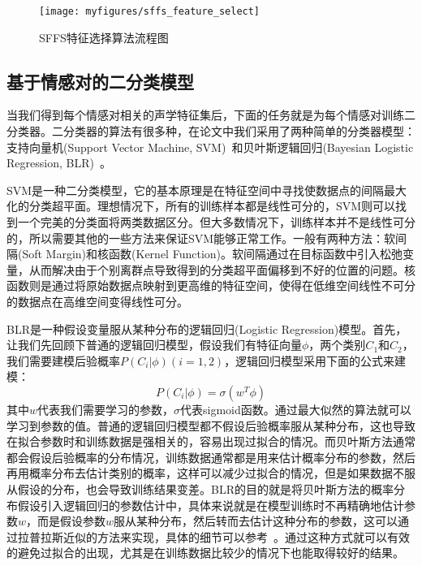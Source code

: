 \begin{figure}[htb] %
    \vspace{-0.8cm}  %
    \setlength{\belowcaptionskip}{0cm}   %
    \centering
    \texttt{[image: myfigures/sffs\_feature\_select]}
    \caption{SFFS特征选择算法流程图}
    \label{fig:sffs_feature_select}
\end{figure}

\subsection{基于情感对的二分类模型}
\label{ssec:emo_pair_bi_cls}

当我们得到每个情感对相关的声学特征集后，下面的任务就是为每个情感对训练二分类器。二分类器的算法有很多种，在论文中我们采用了两种简单的分类器模型：支持向量机(Support Vector Machine, SVM)~\cite{Burges2008A}和贝叶斯逻辑回归(Bayesian Logistic Regression, BLR)~\cite{Genkin2007Large}。

SVM是一种二分类模型，它的基本原理是在特征空间中寻找使数据点的间隔最大化的分类超平面。理想情况下，所有的训练样本都是线性可分的，SVM则可以找到一个完美的分类面将两类数据区分。但大多数情况下，训练样本并不是线性可分的，所以需要其他的一些方法来保证SVM能够正常工作。一般有两种方法：软间隔(Soft Margin)和核函数(Kernel Function)。软间隔通过在目标函数中引入松弛变量，从而解决由于个别离群点导致得到的分类超平面偏移到不好的位置的问题。核函数则是通过将原始数据点映射到更高维的特征空间，使得在低维空间线性不可分的数据点在高维空间变得线性可分。

 BLR是一种假设变量服从某种分布的逻辑回归(Logistic Regression)模型。首先，让我们先回顾下普通的逻辑回归模型，假设我们有特征向量$\phi$，两个类别$C_1$和$C_2$，我们需要建模后验概率$P(C_i|\phi)(i=1,2)$，逻辑回归模型采用下面的公式来建模：
 \begin{equation}
\label{equ:lagrange_multiplier}
    P(C_i|\phi) = \sigma(w^T\phi)
\end{equation}
其中$w$代表我们需要学习的参数，$\sigma$代表sigmoid函数。通过最大似然的算法就可以学习到参数的值。普通的逻辑回归模型都不假设后验概率服从某种分布，这也导致在拟合参数时和训练数据是强相关的，容易出现过拟合的情况。而贝叶斯方法通常都会假设后验概率的分布情况，训练数据通常都是用来估计概率分布的参数，然后再用概率分布去估计类别的概率，这样可以减少过拟合的情况，但是如果数据不服从假设的分布，也会导致训练结果变差。BLR的目的就是将贝叶斯方法的概率分布假设引入逻辑回归的参数估计中，具体来说就是在模型训练时不再精确地估计参数$w$，而是假设参数$w$服从某种分布，然后转而去估计这种分布的参数，这可以通过拉普拉斯近似的方法来实现，具体的细节可以参考~\cite{Genkin2007Large}。通过这种方式就可以有效的避免过拟合的出现，尤其是在训练数据比较少的情况下也能取得较好的结果。

